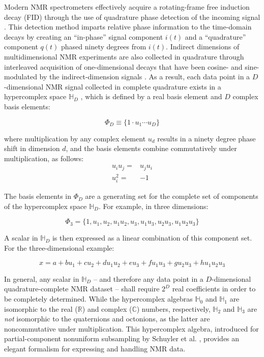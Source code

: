 \begin{doublespace}
Modern NMR spectrometers effectively acquire a rotating-frame free induction
decay (FID) through the use of quadrature phase detection of the incoming
signal \cite{levitt2008}. This detection method imparts relative phase
information to the time-domain decays by creating an ``in-phase'' signal
component $i(t)$ and a ``quadrature'' component $q(t)$ phased ninety degrees
from $i(t)$. Indirect dimensions of multidimensional NMR experiments are also
collected in quadrature through interleaved acquisition of one-dimensional
decays that have been cosine- and sine-modulated by the indirect-dimension
signals \cite{states:jmr1982}. As a result, each data point in a
$D$-dimensional NMR signal collected in complete quadrature exists in a
hypercomplex space $\mathbb{H}_D$ \cite{schuyler:jmr2013}, which is defined by
a real basis element and $D$ complex basis elements:

\begin{equation}
\Phi_D \equiv \{ 1 \cdot u_1 \cdots u_D \}
\end{equation}

where multiplication by any complex element $u_d$ results in a ninety degree
phase shift in dimension $d$, and the basis elements combine commutatively
under multiplication, as follows:
\begin{align}
u_i u_j =& u_j u_i \\
u_i^2 =& -1
\end{align}

The basis elements in $\Phi_D$ are a generating set for the complete set of
components of the hypercomplex space $\mathbb{H}_D$. For example, in three
dimensions:

\begin{equation}
\Phi_3 = \{ 1, u_1, u_2, u_1 u_2, u_3, u_1 u_3, u_2 u_3, u_1 u_2 u_3 \}
\end{equation}

A scalar in $\mathbb{H}_D$ is then expressed as a linear combination of this
component set. For the three-dimensional example:

\begin{equation}
x = a + b u_1 + c u_2 + d u_1 u_2
  + e u_3 + f u_1 u_3 + g u_2 u_3 + h u_1 u_2 u_3
\end{equation}

In general, any scalar in $\mathbb{H}_D$ -- and therefore any data point in
a $D$-dimensional quadrature-complete NMR dataset -- shall require $2^D$ real
coefficients in order to be completely determined. While the hypercomplex
algebras $\mathbb{H}_0$ and $\mathbb{H}_1$ are isomorphic to the real 
($\mathbb{R}$) and complex ($\mathbb{C}$) numbers, respectively, $\mathbb{H}_2$
and $\mathbb{H}_3$ are {\it not} isomorphic to the quaternions and octonions,
as the latter are noncommutative under multiplication. This hypercomplex
algebra, introduced for partial-component nonuniform subsampling by Schuyler
et al. \cite{schuyler:jmr2013}, provides an elegant formalism for expressing
and handling NMR data.
\end{doublespace}

